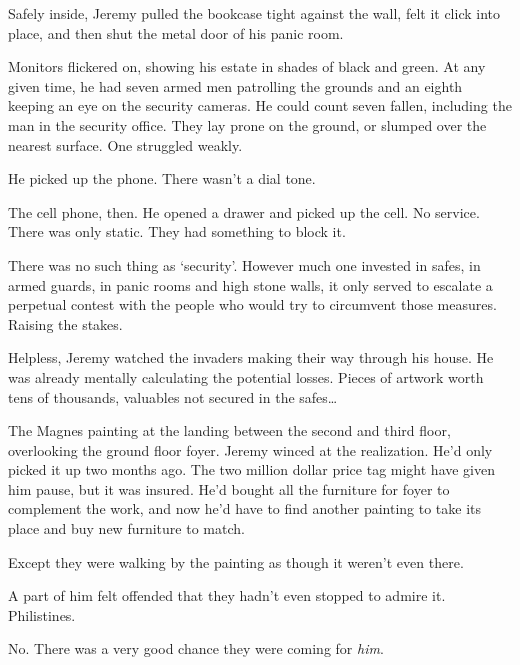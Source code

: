 Safely inside, Jeremy pulled the bookcase tight against the wall, felt it click into place, and then shut the metal door of his panic room.



Monitors flickered on, showing his estate in shades of black and green.  At any given time, he had seven armed men patrolling the grounds and an eighth keeping an eye on the security cameras.  He could count seven fallen, including the man in the security office.   They lay prone on the ground, or slumped over the nearest surface.  One struggled weakly.



He picked up the phone.  There wasn't a dial tone.



The cell phone, then.  He opened a drawer and picked up the cell.  No service.  There was only static.  They had something to block it.



There was no such thing as `security'.  However much one invested in safes, in armed guards, in panic rooms and high stone walls, it only served to escalate a perpetual contest with the people who would try to circumvent those measures.  Raising the stakes.



Helpless, Jeremy watched the invaders making their way through his house.  He was already mentally calculating the potential losses.  Pieces of artwork worth tens of thousands, valuables not secured in the safes\ldots



The Magnes painting at the landing between the second and third floor, overlooking the ground floor foyer.  Jeremy winced at the realization.  He'd only picked it up two months ago.  The two million dollar price tag might have given him pause, but it was insured.  He'd bought all the furniture for foyer to complement the work, and now he'd have to find another painting to take its place and buy new furniture to match.



Except they were walking by the painting as though it weren't even there.



A part of him felt offended that they hadn't even stopped to admire it.  Philistines.



No.  There was a very good chance they were coming for \emph{him}.



